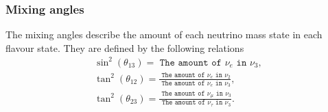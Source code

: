 \documentclass[12pt]{article}
\begin{document}
\subsubsection{Mixing angles}
The mixing angles describe the amount of each neutrino mass state in each flavour state. They are defined by the following relations\cite{APS}
\begin{align}
\sin^{2}(\theta_{13})= \texttt{ The amount of } \nu_{e} \texttt{ in } \nu_{3},\\
\tan^{2}(\theta_{12})= \frac{\texttt{ The amount of } \nu_{e} \texttt{ in } \nu_{2}}{\texttt{ The amount of } \nu_{e} \texttt{ in } \nu_{3}},\\
\tan^{2}(\theta_{23})= \frac{\texttt{ The amount of } \nu_{\mu} \texttt{ in } \nu_{3} }{\texttt{ The amount of } \nu_{\tau} \texttt{ in } \nu_{3} }.
\end{align}
\end{document}

